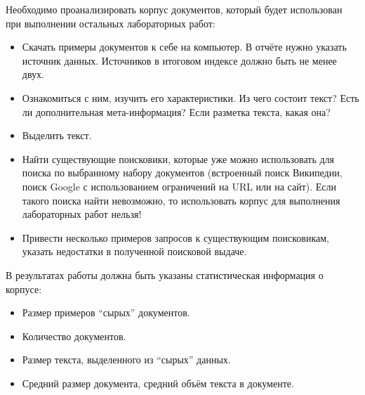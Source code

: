 
Необходимо проанализировать корпус документов, который будет использован при выполнении остальных лабораторных работ:
\begin{itemize}
    \item Скачать примеры документов к себе на компьютер. В отчёте нужно указать источник данных. Источников в итоговом индексе должно быть не менее двух.
    \item Ознакомиться с ним, изучить его характеристики. Из чего состоит текст? Есть ли дополнительная мета-информация? Если разметка текста, какая она?
    \item Выделить текст.
    \item Найти существующие поисковики, которые уже можно использовать для поиска по выбранному набору документов (встроенный поиск Википедии, поиск Google с использованием ограничений на URL или на сайт). Если такого поиска найти невозможно, то использовать корпус для выполнения лабораторных работ нельзя!
    \item Привести несколько примеров запросов к существующим поисковикам, указать недостатки в полученной поисковой выдаче.
\end{itemize}

В результатах работы должна быть указаны статистическая информация о корпусе:
\begin{itemize}
    \item Размер примеров \enquote{сырых} документов.
    \item Количество документов.
    \item Размер текста, выделенного из \enquote{сырых} данных.
    \item Средний размер документа, средний объём текста в документе.
\end{itemize}

\pagebreak
